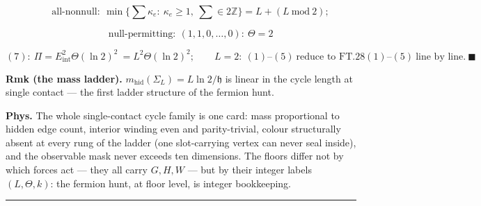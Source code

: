 \begin{theorem}
\[
\qquad \text{all-nonnull}:\ \min\{\textstyle\sum\kappa_e:\ \kappa_e\ge1,\ \sum\in2\mathbb Z\}=L+(L\ \mathrm{mod}\ 2);
\]

\[
\qquad \text{null-permitting}:\ (1,1,0,\dots,0):\ \Theta=2
\]

\[
(7):\ \Pi=E_{\mathrm{int}}^2\Theta(\ln2)^2\ =L^2\Theta(\ln2)^2;\qquad L=2:\ (1)\text{--}(5)\ \text{reduce to FT.28}(1)\text{--}(5)\ \text{line by line}.\ \blacksquare
\]

\textbf{Rmk (the mass ladder).} $m_{\mathrm{hid}}(\Sigma_L)=L\ln2/\mathfrak h$ is linear in the cycle length at single contact — the first ladder structure of the fermion hunt.

\textbf{Phys.} The whole single-contact cycle family is one card: mass proportional to hidden edge count, interior winding even and parity-trivial, colour structurally absent at every rung of the ladder (one slot-carrying vertex can never seal inside), and the observable mask never exceeds ten dimensions. The floors differ not by which forces act — they all carry $G,H,W$ — but by their integer labels $(L,\Theta,k)$: the fermion hunt, at floor level, is integer bookkeeping.

\vspace{2pt}\noindent\rule{\textwidth}{0.4pt}\vspace{2pt}

\end{theorem}

